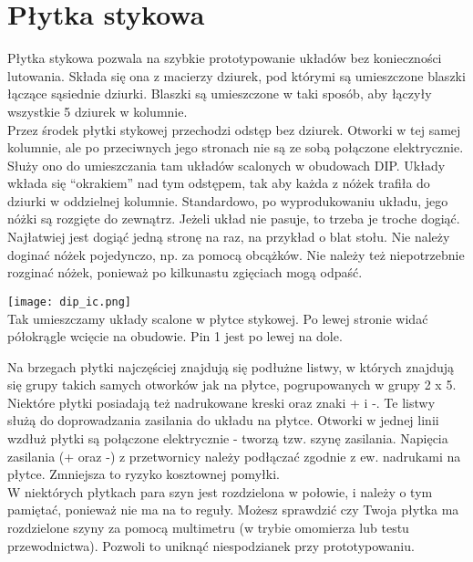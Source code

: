 \documentclass{pdfBooklets}
\begin{document}
\section{Płytka stykowa}
Płytka stykowa pozwala na szybkie prototypowanie układów bez konieczności lutowania. Składa się ona z macierzy dziurek,
pod którymi są umieszczone blaszki łączące sąsiednie dziurki. Blaszki są umieszczone w taki sposób, aby łączyły wszystkie
5 dziurek w kolumnie.
\\

Przez środek płytki stykowej przechodzi odstęp bez dziurek. Otworki w tej samej kolumnie, ale po przeciwnych jego
stronach nie są ze sobą połączone elektrycznie. Służy ono do umieszczania tam układów scalonych w obudowach DIP.
Układy wkłada się ``okrakiem'' nad tym odstępem, tak aby każda z nóżek trafiła do dziurki w oddzielnej kolumnie.
Standardowo, po wyprodukowaniu układu, jego nóżki są rozgięte do zewnątrz. Jeżeli układ nie pasuje, to trzeba je troche dogiąć.
Najłatwiej jest dogiąć jedną stronę na raz, na przykład o blat stołu. Nie należy doginać nóżek pojedynczo, np. za pomocą obcążków.
Nie należy też niepotrzebnie rozginać nóżek, ponieważ po kilkunastu zgięciach mogą odpaść.
\\

\begin{center}
  \noindent\texttt{[image: dip\_ic.png]}\\
  Tak umieszczamy układy scalone w płytce stykowej. Po lewej stronie widać półokrągle wcięcie na obudowie. Pin 1 jest po lewej na dole.
\end{center}

Na brzegach płytki najczęściej znajdują się podłużne listwy, w których znajdują się grupy takich samych otworków jak
na płytce, pogrupowanych w grupy 2 x 5. Niektóre płytki posiadają też nadrukowane kreski oraz znaki + i -. Te listwy
służą do doprowadzania zasilania do układu na płytce. Otworki w jednej linii wzdłuż płytki są połączone elektrycznie - tworzą tzw.
szynę zasilania. Napięcia zasilania (+ oraz -) z przetwornicy należy podłączać zgodnie z ew. nadrukami na płytce. Zmniejsza to ryzyko
kosztownej pomyłki.
\\

W niektórych płytkach para szyn jest rozdzielona w połowie, i należy o tym pamiętać, ponieważ nie ma na to reguły.
Możesz sprawdzić czy Twoja płytka ma rozdzielone szyny za pomocą multimetru (w trybie omomierza lub testu przewodnictwa). Pozwoli to uniknąć
niespodzianek przy prototypowaniu.
\end{document}
